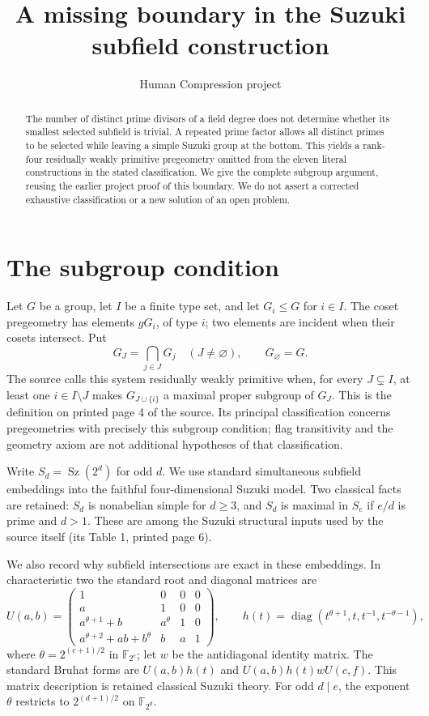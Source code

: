 \documentclass[11pt,a4paper]{article}
\title{A missing boundary in the Suzuki subfield construction}
\author{Human Compression project}\date{}
\newcommand{\F}{\mathbb F}
\newcommand{\Sz}{\operatorname{Sz}}
\begin{document}
\maketitle
\begin{abstract}
The number of distinct prime divisors of a field degree does not determine
whether its smallest selected subfield is trivial. A repeated prime factor
allows all distinct primes to be selected while leaving a simple Suzuki
group at the bottom. This yields a rank-four residually weakly primitive
pregeometry omitted from the eleven literal constructions in the stated
classification. We give the complete subgroup argument, reusing the
earlier project proof of this boundary. We do not assert a corrected
exhaustive classification or a new solution of an open problem.
\end{abstract}

\section{The subgroup condition}
Let $G$ be a group, let $I$ be a finite type set, and let $G_i\le G$
for $i\in I$. The coset pregeometry has elements $gG_i$, of type $i$;
two elements are incident when their cosets intersect. Put
\[
 G_J=\bigcap_{j\in J}G_j\quad(J\ne\varnothing),\qquad
 G_\varnothing=G.
\]
The source calls this system residually weakly primitive when, for every
$J\subsetneq I$, at least one $i\in I\setminus J$ makes
$G_{J\cup\{i\}}$ a maximal proper subgroup of $G_J$.
This is the definition on printed page 4 of the source. Its principal
classification concerns pregeometries with precisely this subgroup
condition; flag transitivity and the geometry axiom are not additional
hypotheses of that classification.

Write $S_d=\Sz(2^d)$ for odd $d$. We use standard simultaneous
subfield embeddings into the faithful four-dimensional Suzuki model.
Two classical facts are retained: $S_d$ is nonabelian simple for
$d\ge3$, and $S_d$ is maximal in $S_e$ if $e/d$ is prime and $d>1$.
These are among the Suzuki structural inputs used by the source itself
(its Table 1, printed page 6).

We also record why subfield intersections are exact in these embeddings.
In characteristic two the standard root and diagonal matrices are
\[
 U(a,b)=\begin{pmatrix}
 1&0&0&0\\a&1&0&0\\a^{\theta+1}+b&a^\theta&1&0\\
 a^{\theta+2}+ab+b^\theta&b&a&1
 \end{pmatrix},\qquad
 h(t)=\operatorname{diag}(t^{\theta+1},t,t^{-1},t^{-\theta-1}),
\]
where $\theta=2^{(e+1)/2}$ in $\F_{2^e}$; let $w$ be the
antidiagonal identity matrix. The standard Bruhat forms are
$U(a,b)h(t)$ and $U(a,b)h(t)wU(c,f)$. This matrix description is
retained classical Suzuki theory. For odd $d\mid e$, the exponent
$\theta$ restricts to $2^{(d+1)/2}$ on $\F_{2^d}$.
\end{document}
